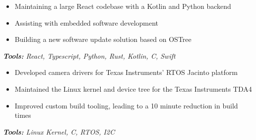 \documentclass[10pt,letter]{altacv}
\begin{document}

\begin{fullwidth}
\marginpar{\makesidebarheader}
    \vspace*{-1\baselineskip}
\makecvheader
\end{fullwidth}

\vspace{19.5pt}


\begin{itemize}
  \item Maintaining a large React codebase with a Kotlin and Python backend
  \item Assisting with embedded software development
  \item Building a new software update solution based on OSTree
\end{itemize}
\textit{\textbf{Tools:} React, Typescript, Python, Rust, Kotlin, C, Swift}

\divider

\begin{itemize}
  \item Developed camera drivers for Texas Instruments' RTOS Jacinto platform
  \item Maintained the Linux kernel and device tree for the Texas Instruments TDA4
  \item Improved custom build tooling, leading to a 10 minute reduction in build times
\end{itemize}
\textit{\textbf{Tools:} Linux Kernel, C, RTOS, I2C}
\end{document}
